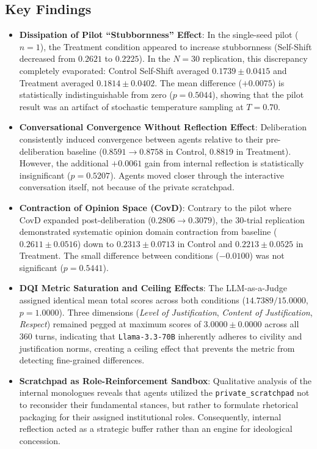 \documentclass[titlepage]{article}
\begin{document}
\subsection{Key Findings}
\begin{itemize}
    \item \textbf{Dissipation of Pilot ``Stubbornness'' Effect}: In the single-seed pilot ($n = 1$), the Treatment condition appeared to increase stubbornness (Self-Shift decreased from $0.2621$ to $0.2225$). In the $N = 30$ replication, this discrepancy completely evaporated: Control Self-Shift averaged $0.1739 \pm 0.0415$ and Treatment averaged $0.1814 \pm 0.0402$. The mean difference ($+0.0075$) is statistically indistinguishable from zero ($p = 0.5044$), showing that the pilot result was an artifact of stochastic temperature sampling at $T = 0.70$.
    \item \textbf{Conversational Convergence Without Reflection Effect}: Deliberation consistently induced convergence between agents relative to their pre-deliberation baseline ($0.8591 \rightarrow 0.8758$ in Control, $0.8819$ in Treatment). However, the additional $+0.0061$ gain from internal reflection is statistically insignificant ($p = 0.5207$). Agents moved closer through the interactive conversation itself, not because of the private scratchpad.
    \item \textbf{Contraction of Opinion Space (CovD)}: Contrary to the pilot where CovD expanded post-deliberation ($0.2806 \rightarrow 0.3079$), the 30-trial replication demonstrated systematic opinion domain contraction from baseline ($0.2611 \pm 0.0516$) down to $0.2313 \pm 0.0713$ in Control and $0.2213 \pm 0.0525$ in Treatment. The small difference between conditions ($-0.0100$) was not significant ($p = 0.5441$).
    \item \textbf{DQI Metric Saturation and Ceiling Effects}: The LLM-as-a-Judge assigned identical mean total scores across both conditions ($14.7389 / 15.0000$, $p = 1.0000$). Three dimensions (\textit{Level of Justification}, \textit{Content of Justification}, \textit{Respect}) remained pegged at maximum scores of $3.0000 \pm 0.0000$ across all 360 turns, indicating that \texttt{Llama-3.3-70B} inherently adheres to civility and justification norms, creating a ceiling effect that prevents the metric from detecting fine-grained differences.
    \item \textbf{Scratchpad as Role-Reinforcement Sandbox}: Qualitative analysis of the internal monologues reveals that agents utilized the \texttt{private\_scratchpad} not to reconsider their fundamental stances, but rather to formulate rhetorical packaging for their assigned institutional roles. Consequently, internal reflection acted as a strategic buffer rather than an engine for ideological concession.
\end{itemize}
\end{document}
